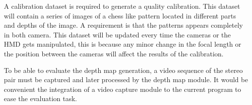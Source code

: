 \documentclass[10pt,a4paper,twocolumn,twoside]{article}
\begin{document}
	A calibration dataset is required to generate a quality calibration. This dataset will contain a series of images of a chess like pattern located in different parts and depths of the image. A requirement is that the patterns appears completely in both camera. This dataset will be updated every time the cameras or the HMD gets manipulated, this is because any minor change in the focal length or the position between the cameras will affect the results of the calibration.
	
	To be able to evaluate the depth map generation, a video sequence of the stereo pair must be captured and later processed by the depth map module. It would be convenient the integration of a video capture module to the current program to ease the evaluation task.
	
	
\end{document}
